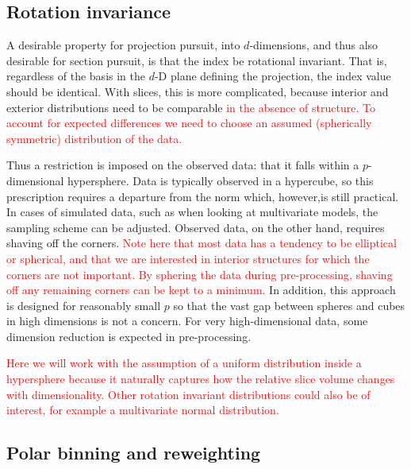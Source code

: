 \documentclass[]{interact}
\theoremstyle{plain}%
\theoremstyle{definition}
\theoremstyle{remark}
\begin{document}
\hypertarget{rotation-invariance}{%
\subsection{\texorpdfstring{Rotation invariance
\label{sec:rotinv}}{Rotation invariance }}\label{rotation-invariance}}

A desirable property for projection pursuit, into \(d\)-dimensions, and
thus also desirable for section pursuit, is that the index be rotational
invariant. That is, regardless of the basis in the \(d\)-D plane
defining the projection, the index value should be identical. With
slices, this is more complicated, because interior and exterior
distributions need to be comparable
\textcolor{red}{in the absence of structure. To account for expected differences we need to choose an assumed (spherically symmetric) distribution of the data.}

Thus a restriction is imposed on the observed data: that it falls within
a \(p\)-dimensional hypersphere. Data is typically observed in a
hypercube, so this prescription requires a departure from the norm
which, however,is still practical. In cases of simulated data, such as
when looking at multivariate models, the sampling scheme can be
adjusted. Observed data, on the other hand, requires shaving off the
corners.
\textcolor{red}{Note here that most data has a tendency to be elliptical or spherical, and that we are interested in interior structures for which the corners are not important. By sphering the data during pre-processing, shaving off any remaining corners can be kept to a minimum.}
In addition, this approach is designed for reasonably small \(p\) so
that the vast gap between spheres and cubes in high dimensions is not a
concern. For very high-dimensional data, some dimension reduction is
expected in pre-processing.

\textcolor{red}{Here we will work with the assumption of a uniform distribution inside a hypersphere because it naturally captures how the relative slice volume changes with dimensionality. Other rotation invariant distributions could also be of interest, for example a multivariate normal distribution.}

\hypertarget{polar-binning-and-reweighting}{%
\subsection{\texorpdfstring{Polar binning and reweighting
\label{sec:binning}}{Polar binning and reweighting }}\label{polar-binning-and-reweighting}}
\end{document}
